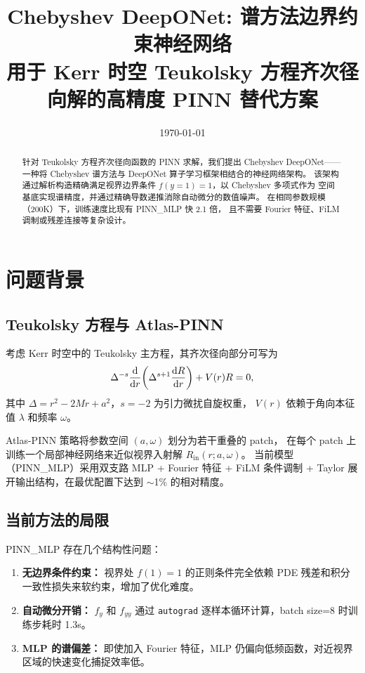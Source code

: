 \documentclass[11pt,a4paper]{article}
\title{Chebyshev DeepONet: 谱方法边界约束神经网络\\[3pt]
\large 用于 Kerr 时空 Teukolsky 方程齐次径向解的高精度 PINN 替代方案}
\author{}
\date{\today}
\begin{document}
\maketitle

\begin{abstract}
针对 Teukolsky 方程齐次径向函数的 PINN 求解，我们提出 Chebyshev DeepONet——
一种将 Chebyshev 谱方法与 DeepONet 算子学习框架相结合的神经网络架构。
该架构通过解析构造精确满足视界边界条件 $f(y=1)=1$，以 Chebyshev 多项式作为
空间基底实现谱精度，并通过精确导数递推消除自动微分的数值噪声。
在相同参数规模（200K）下，训练速度比现有 PINN\_MLP 快 2.1 倍，
且不需要 Fourier 特征、FiLM 调制或残差连接等复杂设计。
\end{abstract}

\section{问题背景}

\subsection{Teukolsky 方程与 Atlas-PINN}

考虑 Kerr 时空中的 Teukolsky 主方程，其齐次径向部分可写为
\begin{equation}
\Delta^{-s}\dv{r}\qty(\Delta^{s+1}\dv{R}{r}) + V(r)R = 0,
\label{eq:teukolsky}
\end{equation}
其中 $\Delta = r^2 - 2Mr + a^2$，$s=-2$ 为引力微扰自旋权重，
$V(r)$ 依赖于角向本征值 $\lambda$ 和频率 $\omega$。

Atlas-PINN 策略将参数空间 $(a,\omega)$ 划分为若干重叠的 patch，
在每个 patch 上训练一个局部神经网络来近似视界入射解 $R_{\text{in}}(r;a,\omega)$。
当前模型（PINN\_MLP）采用双支路 MLP + Fourier 特征 + FiLM 条件调制 +
Taylor 展开输出结构，在最优配置下达到 $\sim$1\% 的相对精度。

\subsection{当前方法的局限}

PINN\_MLP 存在几个结构性问题：
\begin{enumerate}
    \item \textbf{无边界条件约束：} 视界处 $f(1)=1$ 的正则条件完全依赖 PDE 残差和积分一致性损失来软约束，增加了优化难度。
    \item \textbf{自动微分开销：} $f_y$ 和 $f_{yy}$ 通过 \texttt{autograd} 逐样本循环计算，batch size=8 时训练步耗时 1.3s。
    \item \textbf{MLP 的谱偏差：} 即使加入 Fourier 特征，MLP 仍偏向低频函数，对近视界区域的快速变化捕捉效率低。
\end{enumerate}
\end{document}
